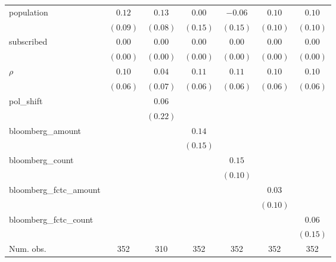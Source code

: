 \begin{table}[!h]
\begin{center}
\begin{tabular}{l c c c c c c }
population              & $0.12$       & $0.13$       & $0.00$       & $-0.06$      & $0.10$       & $0.10$       \\
                        & $(0.09)$     & $(0.08)$     & $(0.15)$     & $(0.15)$     & $(0.10)$     & $(0.10)$     \\
subscribed              & $0.00$       & $0.00$       & $0.00$       & $0.00$       & $0.00$       & $0.00$       \\
                        & $(0.00)$     & $(0.00)$     & $(0.00)$     & $(0.00)$     & $(0.00)$     & $(0.00)$     \\
$\rho$                  & $0.10$       & $0.04$       & $0.11$       & $0.11$       & $0.10$       & $0.10$       \\
                        & $(0.06)$     & $(0.07)$     & $(0.06)$     & $(0.06)$     & $(0.06)$     & $(0.06)$     \\
pol\_shift              &              & $0.06$       &              &              &              &              \\
                        &              & $(0.22)$     &              &              &              &              \\
bloomberg\_amount       &              &              & $0.14$       &              &              &              \\
                        &              &              & $(0.15)$     &              &              &              \\
bloomberg\_count        &              &              &              & $0.15$       &              &              \\
                        &              &              &              & $(0.10)$     &              &              \\
bloomberg\_fctc\_amount &              &              &              &              & $0.03$       &              \\
                        &              &              &              &              & $(0.10)$     &              \\
bloomberg\_fctc\_count  &              &              &              &              &              & $0.06$       \\
                        &              &              &              &              &              & $(0.15)$     \\
\midrule
Num. obs.               & 352          & 310          & 352          & 352          & 352          & 352          \\

\end{tabular}
\end{center}
\end{table}
